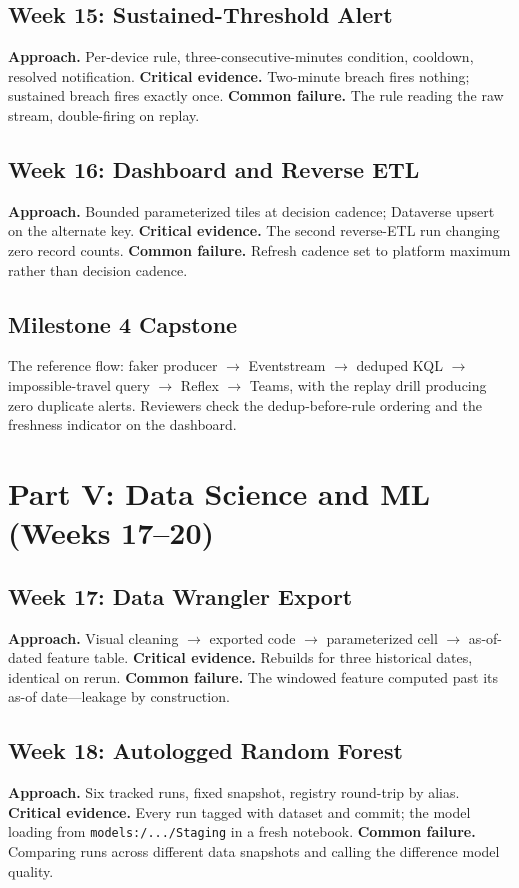 \subsection{Week 15: Sustained-Threshold Alert}
\textbf{Approach.} Per-device rule, three-consecutive-minutes condition, cooldown, resolved
notification. \textbf{Critical evidence.} Two-minute breach fires nothing; sustained breach fires
exactly once. \textbf{Common failure.} The rule reading the raw stream, double-firing on replay.

\subsection{Week 16: Dashboard and Reverse ETL}
\textbf{Approach.} Bounded parameterized tiles at decision cadence; Dataverse upsert on the
alternate key. \textbf{Critical evidence.} The second reverse-ETL run changing zero record
counts. \textbf{Common failure.} Refresh cadence set to platform maximum rather than decision
cadence.

\subsection{Milestone 4 Capstone}
The reference flow: faker producer $\rightarrow$ Eventstream $\rightarrow$ deduped KQL $\rightarrow$
impossible-travel query $\rightarrow$ Reflex $\rightarrow$ Teams, with the replay drill producing
zero duplicate alerts. Reviewers check the dedup-before-rule ordering and the freshness indicator
on the dashboard.

\section{Part V: Data Science and ML (Weeks 17--20)}
\subsection{Week 17: Data Wrangler Export}
\textbf{Approach.} Visual cleaning $\rightarrow$ exported code $\rightarrow$ parameterized cell
$\rightarrow$ as-of-dated feature table. \textbf{Critical evidence.} Rebuilds for three historical
dates, identical on rerun. \textbf{Common failure.} The windowed feature computed past its as-of
date---leakage by construction.

\subsection{Week 18: Autologged Random Forest}
\textbf{Approach.} Six tracked runs, fixed snapshot, registry round-trip by alias.
\textbf{Critical evidence.} Every run tagged with dataset and commit; the model loading from
\texttt{models:/.../Staging} in a fresh notebook. \textbf{Common failure.} Comparing runs across
different data snapshots and calling the difference model quality.

